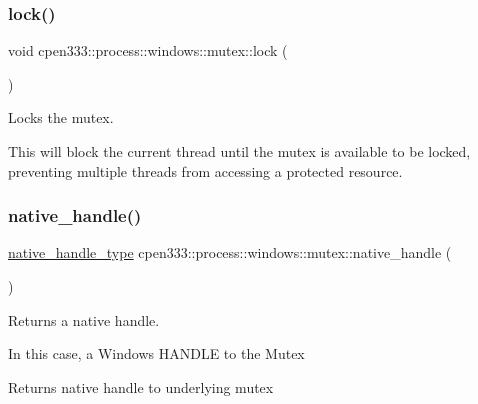 \subsubsection{\texorpdfstring{lock()}{lock()}}
{\footnotesize\ttfamily void cpen333\+::process\+::windows\+::mutex\+::lock (\begin{DoxyParamCaption}{ }\end{DoxyParamCaption})\hspace{0.3cm}{\ttfamily [inline]}}



Locks the mutex. 

This will block the current thread until the mutex is available to be locked, preventing multiple threads from accessing a protected resource. \mbox{\label{classcpen333_1_1process_1_1windows_1_1mutex_a44a60d5a4d372684c8278e7a1f952fb6}} 
\subsubsection{\texorpdfstring{native\+\_\+handle()}{native\_handle()}}
{\footnotesize\ttfamily \hyperlink{classcpen333_1_1process_1_1windows_1_1mutex_a6e4acfaa842ca9c60333a33ea613806b}{native\+\_\+handle\+\_\+type} cpen333\+::process\+::windows\+::mutex\+::native\+\_\+handle (\begin{DoxyParamCaption}{ }\end{DoxyParamCaption})\hspace{0.3cm}{\ttfamily [inline]}}



Returns a native handle. 

In this case, a Windows H\+A\+N\+D\+LE to the Mutex

\begin{DoxyReturn}{Returns}
native handle to underlying mutex 
\end{DoxyReturn}
\mbox{\label{classcpen333_1_1process_1_1windows_1_1mutex_a8fe777a1d576868de91b34d3727132e2}} 
